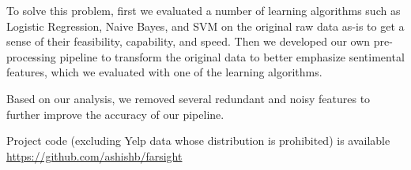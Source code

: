 To solve this problem\cite{Qu:2010:BMR:1873781.1873884,li2010}, first
we evaluated a number of learning algorithms such as Logistic Regression,
Naive Bayes, and SVM on the original raw data as-is to get a sense
of their feasibility, capability, and speed. Then we developed our
own pre-processing pipeline to transform the original data to better
emphasize sentimental features, which we evaluated with one of the
learning algorithms. 

Based on our analysis, we removed several redundant and noisy features
to further improve the accuracy of our pipeline.

Project code (excluding Yelp data whose distribution is prohibited)
is available \href{https://github.com/ashishb/farsight}{https://github.com/ashishb/farsight}

